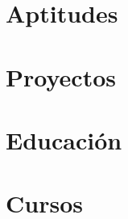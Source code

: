 \documentclass[letter,10pt]{article}
\begin{document}


\section{Aptitudes}


\section{Proyectos}


\section{Educación}



\section{Cursos}

\end{document}
